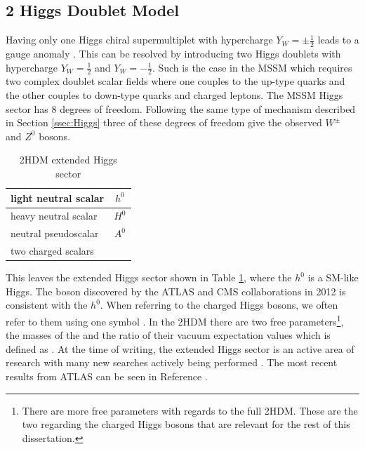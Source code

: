 	\subsection{2 Higgs Doublet Model}\label{ssec:2HDM}
		Having only one Higgs chiral supermultiplet with hypercharge $Y_W=\pm \frac{1}{2}$ leads to a gauge anomaly \cite{2HDM}. This can be resolved by introducing two Higgs doublets with hypercharge $Y_W=\frac{1}{2}$ and $Y_W=-\frac{1}{2}$. Such is the case in the \gls{MSSM} which requires two complex doublet scalar fields where one couples to the up-type quarks and the other couples to down-type quarks and charged leptons. The \gls{MSSM} Higgs sector has 8 degrees of freedom. Following the same type of mechanism described in Section \ref{ssec:Higgs} three of these degrees of freedom give the observed $W^\pm$ and $Z^0$ bosons. 
		\begin{table}[!thp]
				\centering
				\caption{\gls{2HDM} extended Higgs sector \cite{2HDM}}
				\begin{tabular}{| l | c |}
				\hline
				light neutral scalar 	& $h^0$ \\ \hline
				heavy neutral scalar 	& $H^0$ \\ \hline
				neutral pseudoscalar 	& $A^0$ \\ \hline
				two charged scalars 	& \Hpm \\ \hline
 				\end{tabular}
				\label{tab:2HDM}
		\end{table}
		This leaves the extended Higgs sector shown in Table \ref{tab:2HDM}, where the $h^0$ is a SM-like Higgs. The boson discovered by the \gls{ATLAS} and \gls{CMS} collaborations in 2012 is consistent with the $h^{0}$. When referring to the charged Higgs bosons, we often refer to them using one symbol \Hpm. In the \gls{2HDM} there are two free parameters\footnote{There are more free parameters with regards to the full \gls{2HDM}. These are the two regarding the charged Higgs bosons that are relevant for the rest of this dissertation.}, the masses of the \Hpm and the ratio of their vacuum expectation values which is defined as \tanb. At the time of writing, the extended Higgs sector is an active area of research with many new searches actively being performed \cite{pdg}. The most recent results from ATLAS can be seen in Reference \cite{ATLAS-HBSM-Summary}.



